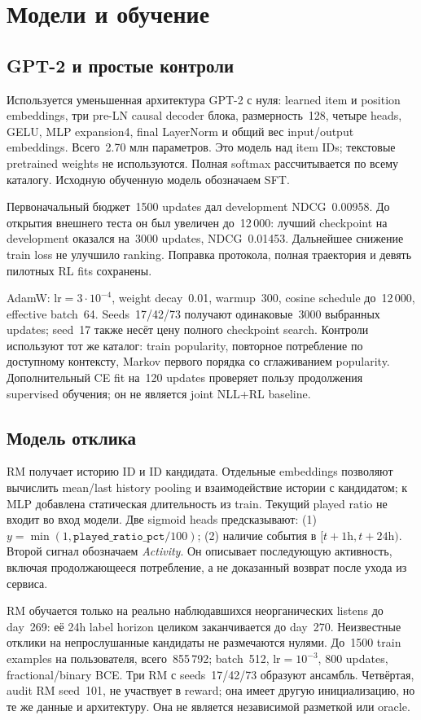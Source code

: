 \documentclass[10pt,a4paper,twocolumn]{article}
\begin{document}
\section{Модели и обучение}

\subsection{GPT-2 и простые контроли}
Используется уменьшенная архитектура GPT-2 с нуля: learned item и position
embeddings, три pre-LN causal decoder блока, размерность~128, четыре heads,
GELU, MLP expansion4, final LayerNorm и общий вес input/output embeddings.
Всего~2.70 млн параметров. Это модель над item IDs; текстовые pretrained
weights не используются. Полная softmax рассчитывается по всему каталогу.
Исходную обученную модель обозначаем SFT.

Первоначальный бюджет~1500 updates дал development NDCG~0.00958.
До открытия внешнего теста он был увеличен до~12\,000: лучший checkpoint
на development оказался на~3000 updates, NDCG~0.01453. Дальнейшее
снижение train loss не улучшило ranking. Поправка протокола,
полная траектория и девять пилотных RL fits сохранены.

AdamW: lr$=3\cdot10^{-4}$, weight decay~0.01, warmup~300,
cosine schedule до~12\,000, effective batch~64. Seeds~17/42/73
получают одинаковые~3000 выбранных updates; seed~17 также несёт цену
полного checkpoint search. Контроли используют тот же каталог:
train popularity, повторное потребление по доступному контексту,
Markov первого порядка со сглаживанием popularity. Дополнительный
CE fit на~120 updates проверяет пользу продолжения supervised обучения;
он не является joint NLL+RL baseline.

\subsection{Модель отклика}
RM получает историю ID и ID кандидата. Отдельные embeddings
позволяют вычислить mean/last history pooling и взаимодействие
истории с кандидатом; к MLP добавлена статическая длительность
из train. Текущий played ratio не входит во вход модели.
Две sigmoid heads предсказывают:
(1) $y=\min(1,\texttt{played\_ratio\_pct}/100)$;
(2) наличие события в $[t+1\mathrm{h},t+24\mathrm{h})$.
Второй сигнал обозначаем \emph{Activity}. Он описывает последующую
активность, включая продолжающееся потребление, а не доказанный возврат
после ухода из сервиса.

RM обучается только на реально наблюдавшихся неорганических listens
до day~269: её 24h label horizon целиком заканчивается до day~270.
Неизвестные отклики на непрослушанные кандидаты не размечаются нулями.
До~1500 train examples на пользователя, всего~855\,792;
batch~512, lr$=10^{-3}$, 800 updates, fractional/binary BCE.
Три RM с seeds~17/42/73 образуют ансамбль. Четвёртая, audit RM seed~101,
не участвует в reward; она имеет другую инициализацию, но те же данные
и архитектуру. Она не является независимой разметкой или oracle.
\end{document}

